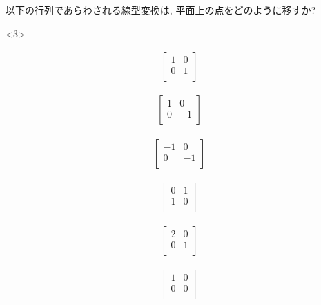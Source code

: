 \begin{q}\label{q:matrix_lintrans2D0} 以下の行列であらわされる線型変換は, 平面上の点をどのように移すか? 
\begin{edaenumerate}<3>
\item 
\begin{eqnarray*} \begin{bmatrix}
1 & 0 \\
0 & 1 \\
\end{bmatrix}\end{eqnarray*}
\mv
\item 
\begin{eqnarray*} \begin{bmatrix}
1 & 0 \\
0 & -1 \\
\end{bmatrix}\end{eqnarray*}
\mv
\item 
\begin{eqnarray*} \begin{bmatrix}
-1 & 0 \\
0 & -1 \\
\end{bmatrix}\end{eqnarray*}
\mv
\item 
\begin{eqnarray*} \begin{bmatrix}
0 & 1 \\
1 & 0 \\
\end{bmatrix}\end{eqnarray*}
\mv
\item 
\begin{eqnarray*} \begin{bmatrix}
2 & 0 \\
0 & 1 \\
\end{bmatrix}\end{eqnarray*}
\mv
\item 
\begin{eqnarray*} \begin{bmatrix}
1 & 0 \\
0 & 0 \\
\end{bmatrix}\end{eqnarray*}
\end{edaenumerate}\end{q}
\mv

